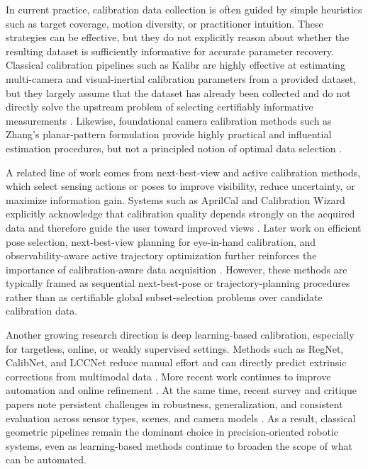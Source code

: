 \documentclass[11pt]{article}
\begin{document}
In current practice, calibration data collection is often guided by simple
heuristics such as target coverage, motion diversity, or practitioner
intuition.
These strategies can be effective, but they do not explicitly reason about
whether the resulting dataset is sufficiently informative for accurate
parameter recovery.
Classical calibration pipelines such as Kalibr are highly effective at
estimating multi-camera and visual-inertial calibration parameters from a
provided dataset, but they largely assume that the dataset has already been
collected and do not directly solve the upstream problem of selecting
certifiably informative measurements \citep{furgale2013kalibr,kalibr_toolbox}.
Likewise, foundational camera calibration methods such as Zhang's
planar-pattern formulation provide highly practical and influential estimation
procedures, but not a principled notion of optimal data selection
\citep{zhang2000flexible}.

A related line of work comes from next-best-view and active calibration
methods, which select sensing actions or poses to improve visibility, reduce
uncertainty, or maximize information gain.
Systems such as AprilCal and Calibration Wizard explicitly acknowledge that
calibration quality depends strongly on the acquired data and therefore guide
the user toward improved views \citep{richardson2013aprilcal,peng2019calibration}.
Later work on efficient pose selection, next-best-view planning for
eye-in-hand calibration, and observability-aware active trajectory optimization
further reinforces the importance of calibration-aware data acquisition
\citep{rojtberg2018efficient,yang2023nbv,wang2025active}.
However, these methods are typically framed as sequential next-best-pose or
trajectory-planning procedures rather than as certifiable global
subset-selection problems over candidate calibration data.

Another growing research direction is deep learning-based calibration,
especially for targetless, online, or weakly supervised settings.
Methods such as RegNet, CalibNet, and LCCNet reduce manual effort and can
directly predict extrinsic corrections from multimodal data
\citep{schneider2017regnet,iyer2018calibnet,lv2021lccnet}.
More recent work continues to improve automation and online refinement
\citep{liao2023survey,huang2025whatmatters}.
At the same time, recent survey and critique papers note persistent challenges
in robustness, generalization, and consistent evaluation across sensor types,
scenes, and camera models \citep{liao2023survey,huang2025whatmatters}.
As a result, classical geometric pipelines remain the dominant choice in
precision-oriented robotic systems, even as learning-based methods continue
to broaden the scope of what can be automated.
\end{document}
